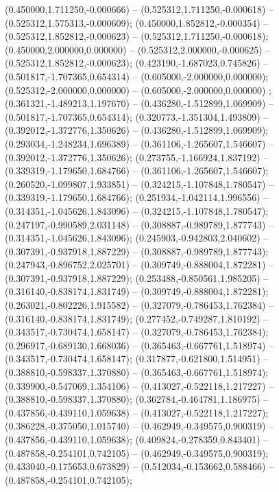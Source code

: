  (0.450000,1.711250,-0.000666) -- (0.525312,1.711250,-0.000618) -- (0.525312,1.575313,-0.000609);
 (0.450000,1.852812,-0.000354) -- (0.525312,1.852812,-0.000623) -- (0.525312,1.711250,-0.000618);
 (0.450000,2.000000,0.000000) -- (0.525312,2.000000,-0.000625) -- (0.525312,1.852812,-0.000623);
 (0.423190,-1.687023,0.745826) -- (0.501817,-1.707365,0.654314) -- (0.605000,-2.000000,0.000000);
 (0.525312,-2.000000,0.000000) -- (0.605000,-2.000000,0.000000) ;
 (0.361321,-1.489213,1.197670) -- (0.436280,-1.512899,1.069909) -- (0.501817,-1.707365,0.654314);
 (0.320773,-1.351304,1.493809) -- (0.392012,-1.372776,1.350626) -- (0.436280,-1.512899,1.069909);
 (0.293034,-1.248234,1.696389) -- (0.361106,-1.265607,1.546607) -- (0.392012,-1.372776,1.350626);
 (0.273755,-1.166924,1.837192) -- (0.339319,-1.179650,1.684766) -- (0.361106,-1.265607,1.546607);
 (0.260520,-1.099807,1.933851) -- (0.324215,-1.107848,1.780547) -- (0.339319,-1.179650,1.684766);
 (0.251934,-1.042114,1.996556) -- (0.314351,-1.045626,1.843096) -- (0.324215,-1.107848,1.780547);
 (0.247197,-0.990589,2.031148) -- (0.308887,-0.989789,1.877743) -- (0.314351,-1.045626,1.843096);
 (0.245903,-0.942803,2.040602) -- (0.307391,-0.937918,1.887229) -- (0.308887,-0.989789,1.877743);
 (0.247943,-0.896752,2.025701) -- (0.309749,-0.888004,1.872281) -- (0.307391,-0.937918,1.887229);
 (0.253488,-0.850561,1.985205) -- (0.316140,-0.838174,1.831749) -- (0.309749,-0.888004,1.872281);
 (0.263021,-0.802226,1.915582) -- (0.327079,-0.786453,1.762384) -- (0.316140,-0.838174,1.831749);
 (0.277452,-0.749287,1.810192) -- (0.343517,-0.730474,1.658147) -- (0.327079,-0.786453,1.762384);
 (0.296917,-0.689130,1.668036) -- (0.365463,-0.667761,1.518974) -- (0.343517,-0.730474,1.658147);
 (0.317877,-0.621800,1.514951) -- (0.388810,-0.598337,1.370880) -- (0.365463,-0.667761,1.518974);
 (0.339900,-0.547069,1.354106) -- (0.413027,-0.522118,1.217227) -- (0.388810,-0.598337,1.370880);
 (0.362784,-0.464781,1.186975) -- (0.437856,-0.439110,1.059638) -- (0.413027,-0.522118,1.217227);
 (0.386228,-0.375050,1.015740) -- (0.462949,-0.349575,0.900319) -- (0.437856,-0.439110,1.059638);
 (0.409824,-0.278359,0.843401) -- (0.487858,-0.254101,0.742105) -- (0.462949,-0.349575,0.900319);
 (0.433040,-0.175653,0.673829) -- (0.512034,-0.153662,0.588466) -- (0.487858,-0.254101,0.742105);
